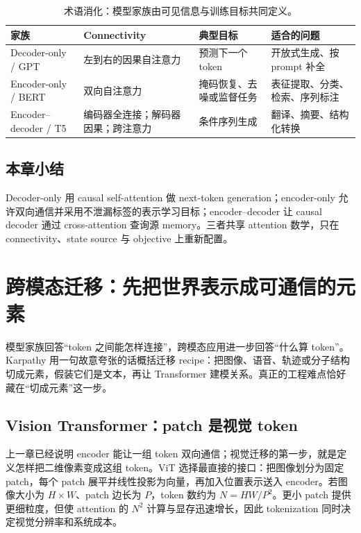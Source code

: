 \documentclass[a4paper]{article}
\begin{document}
\begin{table}[H]
\centering
\small
\begin{tabularx}{\textwidth}{L{2.8cm}L{3.5cm}L{3.2cm}X}
\toprule
家族 & Connectivity & 典型目标 & 适合的问题 \\
\midrule
Decoder-only / GPT & 左到右的因果自注意力 & 预测下一个 token & 开放式生成、按 prompt 补全 \\
Encoder-only / BERT & 双向自注意力 & 掩码恢复、去噪或监督任务 & 表征提取、分类、检索、序列标注 \\
Encoder--decoder / T5 & 编码器全连接；解码器因果；跨注意力 & 条件序列生成 & 翻译、摘要、结构化转换 \\
\bottomrule
\end{tabularx}
\caption{术语消化：模型家族由可见信息与训练目标共同定义。}
\end{table}


\subsection{本章小结}

Decoder-only 用 causal self-attention 做 next-token generation；encoder-only 允许双向通信并采用不泄漏标签的表示学习目标；encoder--decoder 让 causal decoder 通过 cross-attention 查询源 memory。三者共享 attention 数学，只在 connectivity、state source 与 objective 上重新配置。

\section{跨模态迁移：先把世界表示成可通信的元素}

模型家族回答“token 之间能怎样连接”，跨模态应用进一步回答“什么算 token”。Karpathy 用一句故意夸张的话概括迁移 recipe：把图像、语音、轨迹或分子结构切成元素，假装它们是文本，再让 Transformer 建模关系。真正的工程难点恰好藏在“切成元素”这一步。

\subsection{Vision Transformer：patch 是视觉 token}

上一章已经说明 encoder 能让一组 token 双向通信；视觉迁移的第一步，就是定义怎样把二维像素变成这组 token。ViT 选择最直接的接口：把图像划分为固定 patch，每个 patch 展平并线性投影为向量，再加入位置表示送入 encoder。若图像大小为 $H\times W$、patch 边长为 $P$，token 数约为 $N=HW/P^2$。更小 patch 提供更细粒度，但使 attention 的 $N^2$ 计算与显存迅速增长，因此 tokenization 同时决定视觉分辨率和系统成本。
\end{document}
